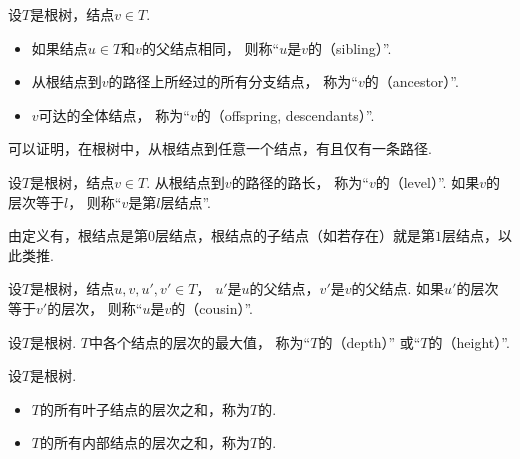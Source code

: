 \begin{definition}
设\(T\)是根树，结点\(v \in T\).
\begin{itemize}
	\item 如果结点\(u \in T\)和\(v\)的父结点相同，
	则称“\(u\)是\(v\)的（sibling）”.
	\item 从根结点到\(v\)的路径上所经过的所有分支结点，
	称为“\(v\)的（ancestor）”.
	\item \(v\)可达的全体结点，
	称为“\(v\)的（offspring, descendants）”.
\end{itemize}
\end{definition}

可以证明，在根树中，从根结点到任意一个结点，有且仅有一条路径.

\begin{definition}
设\(T\)是根树，结点\(v \in T\).
从根结点到\(v\)的路径的路长，
称为“\(v\)的（level）”.
如果\(v\)的层次等于\(l\)，
则称“\(v\)是第\(l\)层结点”.
\end{definition}

由定义有，根结点是第\(0\)层结点，根结点的子结点（如若存在）就是第\(1\)层结点，以此类推.

\begin{definition}
设\(T\)是根树，结点\(u,v,u',v' \in T\)，
\(u'\)是\(u\)的父结点，\(v'\)是\(v\)的父结点.
如果\(u'\)的层次等于\(v'\)的层次，
则称“\(u\)是\(v\)的（cousin）”.
\end{definition}

\begin{definition}
设\(T\)是根树.
\(T\)中各个结点的层次的最大值，
称为“\(T\)的（depth）”
或“\(T\)的（height）”.
\end{definition}

\begin{definition}
设\(T\)是根树.
\begin{itemize}
	\item \(T\)的所有叶子结点的层次之和，称为\(T\)的.
	\item \(T\)的所有内部结点的层次之和，称为\(T\)的.
\end{itemize}
\end{definition}


